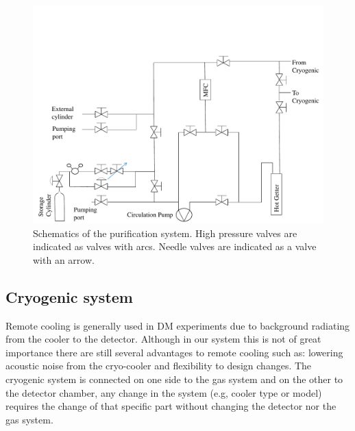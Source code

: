 \begin{figure}[t!]
\centerline{\includegraphics[width=1.\linewidth]{GasSchematics.pdf}}
\caption{Schematics of the purification system. High pressure valves are indicated as valves with arcs. Needle valves are indicated as 
a valve with an arrow.}
\label{fig:gasSchematic}
\end{figure}

\subsection{Cryogenic system}
\label{subsec:cryo}

Remote cooling is generally used in DM experiments due to background radiating from the cooler to the detector. Although in our system 
this is not of great importance there are still several advantages to remote cooling such as: lowering acoustic noise from the cryo-cooler 
and flexibility to design changes. The cryogenic system is connected on one side to the gas system and on the other to the detector chamber, 
any change in the system (e.g, cooler type or model) requires the change of that specific part without changing the detector nor the gas system.

